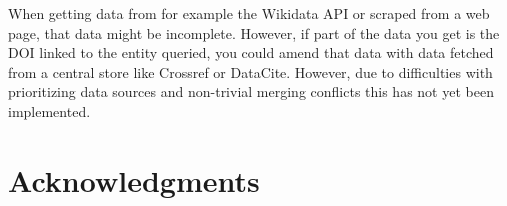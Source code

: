 \documentclass[fleqn,10pt,lineno]{wlpeerj} %
\begin{document}
When getting data from for example the Wikidata API or scraped from a web page, that data might be incomplete. However, if part of the data you get is the DOI linked to the entity queried, you could amend that data with data fetched from a central store like Crossref or DataCite. However, due to difficulties with prioritizing data sources and non-trivial merging conflicts this has not yet been implemented.

\section*{Acknowledgments}



\end{document}
